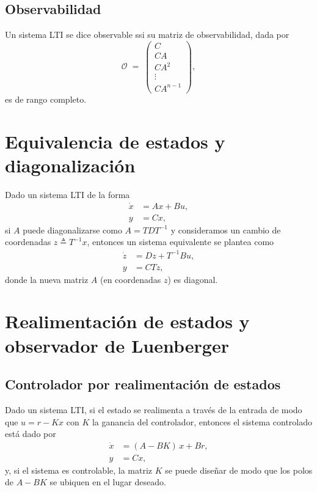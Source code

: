 \documentclass[
  11pt,
  letterpaper,
   addpoints,
  answers
  ]{exam}
\begin{document}
\subsection*{Observabilidad}
Un sistema LTI se dice observable ssi su matriz de observabilidad, dada por
\begin{equation}
  \mathcal{O} \;=\;
  \begin{pmatrix}
    C\\
    CA\\
    CA^{2}\\
    \vdots\\
    CA^{n-1}
  \end{pmatrix},
\end{equation}
es de rango completo.

\section{Equivalencia de estados y diagonalización}

Dado un sistema LTI de la forma
\begin{align}
  \dot{x} &= A x + B u,\\
  y &= C x,
\end{align}
si $A$ puede diagonalizarse como $A=TDT^{-1}$ y consideramos un cambio de coordenadas $z \triangleq T^{-1}x$, entonces un sistema equivalente se plantea como
\begin{align}
  \dot{z} &= D z + T^{-1} B u,\\
  y &= C T z,
\end{align}
donde la nueva matriz $A$ (en coordenadas $z$) es diagonal.

\section*{Realimentación de estados y observador de Luenberger}

\subsection*{Controlador por realimentación de estados}
Dado un sistema LTI, si el estado se realimenta a través de la entrada de modo que $u=r-Kx$ con $K$ la ganancia del controlador, entonces el sistema controlado está dado por
\begin{align}
  \dot{x} &= (A - BK)\,x + B r,\\
  y &= C x,
\end{align}
y, si el sistema es controlable, la matriz $K$ se puede diseñar de modo que los polos de $A-BK$ se ubiquen en el lugar deseado.
\end{document}
